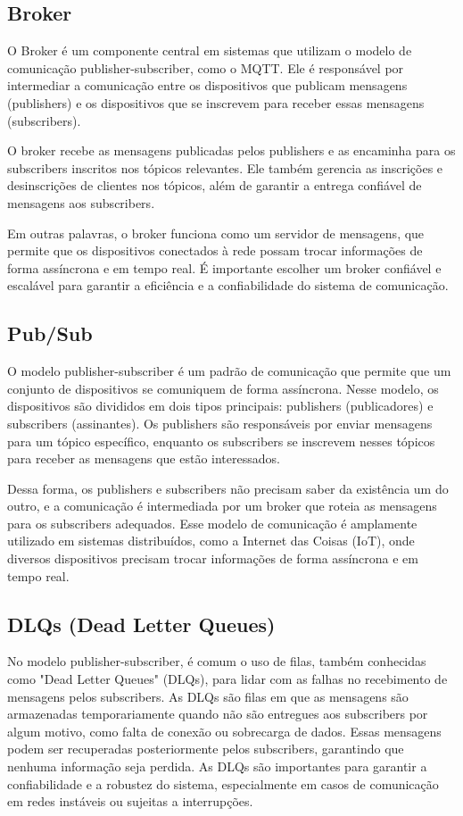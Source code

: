 \documentclass[12pt]{article}
\begin{document}
\subsection{Broker}

O Broker é um componente central em sistemas que utilizam o modelo de comunicação publisher-subscriber, como o MQTT. Ele é responsável por intermediar a comunicação entre os dispositivos que publicam mensagens (publishers) e os dispositivos que se inscrevem para receber essas mensagens (subscribers). 

O broker recebe as mensagens publicadas pelos publishers e as encaminha para os subscribers inscritos nos tópicos relevantes. Ele também gerencia as inscrições e desinscrições de clientes nos tópicos, além de garantir a entrega confiável de mensagens aos subscribers. 

Em outras palavras, o broker funciona como um servidor de mensagens, que permite que os dispositivos conectados à rede possam trocar informações de forma assíncrona e em tempo real. É importante escolher um broker confiável e escalável para garantir a eficiência e a confiabilidade do sistema de comunicação.

\subsection{Pub/Sub}

O modelo publisher-subscriber é um padrão de comunicação que permite que um conjunto de dispositivos se comuniquem de forma assíncrona. Nesse modelo, os dispositivos são divididos em dois tipos principais: publishers (publicadores) e subscribers (assinantes). Os publishers são responsáveis por enviar mensagens para um tópico específico, enquanto os subscribers se inscrevem nesses tópicos para receber as mensagens que estão interessados.

Dessa forma, os publishers e subscribers não precisam saber da existência um do outro, e a comunicação é intermediada por um broker que roteia as mensagens para os subscribers adequados. Esse modelo de comunicação é amplamente utilizado em sistemas distribuídos, como a Internet das Coisas (IoT), onde diversos dispositivos precisam trocar informações de forma assíncrona e em tempo real.

\subsection{DLQs (Dead Letter Queues)}

No modelo publisher-subscriber, é comum o uso de filas, também conhecidas como "Dead Letter Queues" (DLQs), para lidar com as falhas no recebimento de mensagens pelos subscribers. As DLQs são filas em que as mensagens são armazenadas temporariamente quando não são entregues aos subscribers por algum motivo, como falta de conexão ou sobrecarga de dados. Essas mensagens podem ser recuperadas posteriormente pelos subscribers, garantindo que nenhuma informação seja perdida. As DLQs são importantes para garantir a confiabilidade e a robustez do sistema, especialmente em casos de comunicação em redes instáveis ou sujeitas a interrupções.
\end{document}
